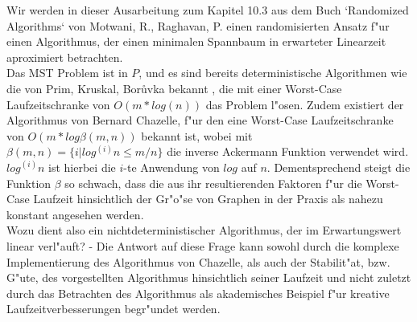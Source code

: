 Wir werden in dieser Ausarbeitung zum Kapitel 10.3 aus dem Buch
    `Randomized Algorithms` von Motwani, R., Raghavan, P.  
    einen
    randomisierten Ansatz f"ur einen Algorithmus, der einen minimalen Spannbaum
    in erwarteter Linearzeit aproximiert betrachten.\\
Das MST Problem ist in $P$, und es sind bereits 
    deterministische Algorithmen wie die von
    Prim, Kruskal, Bor\r uvka bekannt
    , die mit einer Worst-Case Laufzeitschranke 
    von $O(m * log(n))$ das Problem l"osen.
    Zudem existiert der Algorithmus von Bernard Chazelle, f"ur den eine
    Worst-Case Laufzeitschranke von $O(m * log \beta(m,n))$ bekannt ist, wobei
    mit
    $\beta(m,n) = \{i | log^{(i)} n \leq m / n\}$ die inverse Ackermann Funktion
    verwendet wird. 
    $log^{(i)} n$ ist hierbei die $i$-te Anwendung von $log$ auf $n$.
    Dementsprechend steigt die Funktion $\beta$ so schwach, dass die
    aus ihr resultierenden Faktoren f"ur die Worst-Case Laufzeit hinsichtlich
    der Gr"o"se von Graphen in der Praxis als nahezu konstant angesehen werden.\\
Wozu dient also ein nichtdeterministischer Algorithmus, der im Erwartungswert 
    linear verl"auft?
    - Die Antwort auf diese Frage kann sowohl durch die komplexe Implementierung
    des Algorithmus von Chazelle, als auch der Stabilit"at, bzw. G"ute,
    des vorgestellten Algorithmus hinsichtlich seiner Laufzeit
    und nicht zuletzt durch das Betrachten des Algorithmus als akademisches
    Beispiel f"ur kreative Laufzeitverbesserungen begr"undet werden.\\
